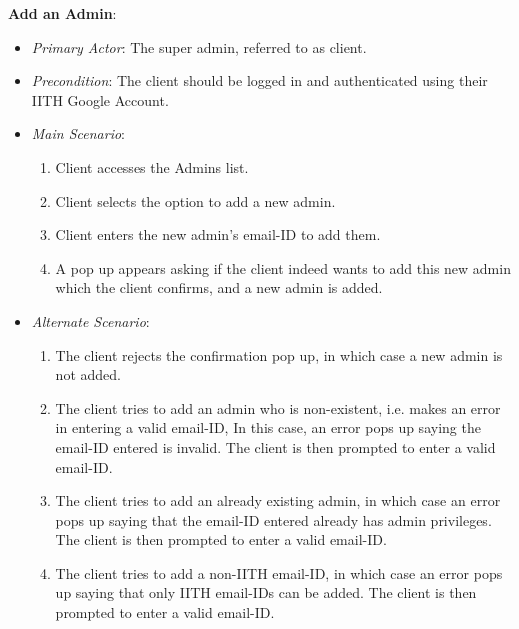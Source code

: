 \documentclass{article}
\begin{document}
\textbf{Add an Admin}:
\label{ucaddanadmin}
\begin{itemize}
    \item \textit{Primary Actor}: The super admin, referred to as client.
    \item \textit{Precondition}: The client should be logged in and authenticated using their IITH Google Account.
    \item \textit{Main Scenario}:
    \begin{enumerate}
        \item Client accesses the Admins list.
        \item Client selects the option to add a new admin.
        \item Client enters the new admin's email-ID to add them.
        \item A pop up appears asking if the client indeed wants to add this new admin which the client confirms, and a new admin is added. 
    \end{enumerate}
    \item \textit{Alternate Scenario}:
    \begin{enumerate}
        \item The client rejects the confirmation pop up, in which case a new admin is not added.
         \item The client tries to add an admin who is non-existent, i.e. makes an error in entering a valid email-ID, In this case, an error pops up saying the email-ID entered is invalid. The client is then prompted to enter a valid email-ID.
         \item The client tries to add an already existing admin, in which case an error pops up saying that the email-ID entered already has admin privileges. The client is then prompted to enter a valid email-ID.
         \item The client tries to add a non-IITH email-ID, in which case an error pops up saying that only IITH email-IDs can be added. The client is then prompted to enter a valid email-ID.
     \end{enumerate}
\end{itemize}
\end{document}
